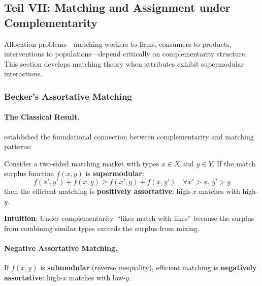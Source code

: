 \subsection{Teil VII: Matching and Assignment under Complementarity}
\label{sec:matching}

Allocation problems---matching workers to firms, consumers to products, interventions 
to populations---depend critically on complementarity structure. This section develops 
matching theory when attributes exhibit supermodular interactions.

\subsubsection{Becker's Assortative Matching}

\paragraph{The Classical Result.}

\citet{becker1973theory} established the foundational connection between complementarity 
and matching patterns:

\begin{theorem}
\label{thm:becker}
Consider a two-sided matching market with types $x \in X$ and $y \in Y$. If the 
match surplus function $f(x, y)$ is \textbf{supermodular}:
\begin{equation}
f(x', y') + f(x, y) \geq f(x', y) + f(x, y') \quad \forall x' > x, \, y' > y
\end{equation}
then the efficient matching is \textbf{positively assortative}: high-$x$ matches 
with high-$y$.
\end{theorem}

\textbf{Intuition}: Under complementarity, ``likes match with likes'' because the 
surplus from combining similar types exceeds the surplus from mixing.

\paragraph{Negative Assortative Matching.}

\begin{corollary}
\label{cor:negative-assort}
If $f(x, y)$ is \textbf{submodular} (reverse inequality), efficient matching is 
\textbf{negatively assortative}: high-$x$ matches with low-$y$.
\end{corollary}

